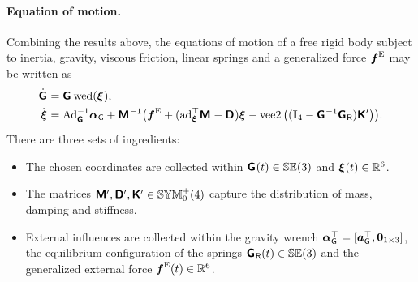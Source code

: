 \paragraph{Equation of motion.}
Combining the results above, the equations of motion of a free rigid body subject to inertia, gravity, viscous friction, linear springs and a generalized force $\boldsymbol{f}^{\mathrm{E}}$ may be written as
\begin{subequations}
\begin{align}
 \dot{\G} &= \G \wedOp(\bodyVel{}{}),
\\
 \bodyVeld{}{} &= \Ad{\G}^{-1} \gravityAccWrench + \bodyInertiaMat{}{}^{-1}\big(\genForceEx + (\ad{\bodyVel{}{}}^\top \bodyInertiaMat{}{} - \bodyDissMat{}{}) \bodyVel{}{} - \veeTwoOp \big( (\idMat[4] - \bodyHomoCoord{}{}^{-1} \bodyHomoCoordR{}{}) \bodyStiffMatp{}{} \big) \big).
\end{align} 
\end{subequations}
There are three sets of ingredients:
\begin{itemize}
\item The chosen coordinates are collected within $\bodyHomoCoord{}{}(t)\in\SpecialEuclideanGroup(3)$ and $\bodyVel{}{}(t)\in\RealNum^6$.
\item The matrices $\bodyInertiaMatp{}{}, \bodyDissMatp{}{}, \bodyStiffMatp{}{} \in \SymMatSP(4)$ capture the distribution of mass, damping and stiffness.
\item External influences are collected within the gravity wrench $\boldsymbol{\alpha}_{\mathsf{G}}^\top = [ \boldsymbol{a}_{\mathsf{G}}^\top, \boldsymbol{0}_{1\times3} ]$, the equilibrium configuration of the springs $\bodyHomoCoordR{}{}(t) \in \SpecialEuclideanGroup(3)$ and the generalized external force $\boldsymbol{f}^{\mathrm{E}}(t)\in\mathbb{R}^6$.
\end{itemize}
